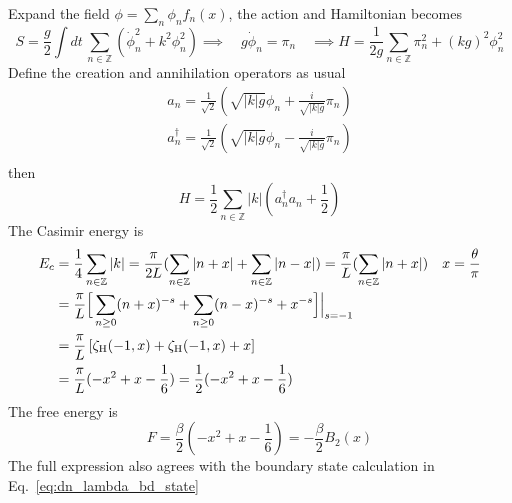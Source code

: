 \documentclass{article}
\begin{document}
Expand the field $\phi = \sum_n \phi_n f_n(x) $, the action and Hamiltonian becomes
\begin{equation}
  S = \frac{g}{2} \int dt \, \sum_{n \in \mathbb{Z} }\left(  \dot{\phi}^2_n + k^2 \phi_n^2 \right) \implies\quad   g \dot{\phi}_n  = \pi_n \quad \implies H =  
\frac{1}{2g}\sum_{n \in \mathbb{Z} } \pi_n^2 + ( kg )^2  \phi_n^2 
\end{equation}
Define the creation and annihilation operators as usual
\begin{equation}
\begin{aligned}
a_n = \frac{1}{\sqrt{2}} ( \sqrt{ |k|g} \phi_n + \frac{i }{\sqrt{|k|g} }\pi_n  ) \\
a^{\dagger}_n = \frac{1}{\sqrt{2}} ( \sqrt{ |k|g} \phi_n - \frac{i }{\sqrt{|k|g} }\pi_n  ) \\
\end{aligned}
\end{equation}
then
\begin{equation}
H = \frac{1}{2} \sum_{n \in \mathbb{Z} } |k|  (a^{\dagger}_n a_n + \frac{1}{2} )
\end{equation}
The Casimir energy is 
\begin{equation}
\begin{aligned}
E_c &= \frac{1}{4} \sum_{n \in \mathbb{Z}} | k| = \frac{\pi}{2L} ( \sum_{n \in \mathbb{Z}}  | n + x | + \sum_{n \in \mathbb{Z}}  | n - x |  )  = \frac{\pi}{L} ( \sum_{n \in \mathbb{Z}}  | n + x |  )\quad x = \frac{\theta}{\pi}\\  
&= \frac{\pi}{L} \Big[\sum_{n \ge 0 } ( n + x )^{-s} + \sum_{n \ge 0 }  ( n - x)^{-s}  +   x^{-s} \Big]\Big|_{s = -1} \\
&= \frac{\pi}{L} \left[ \zeta_{\rm H}( -1, x ) + \zeta_{\rm H}( -1, x ) +  x \right] \\
&= \frac{\pi}{L} ( - x^2 + x - \frac{1}{6})  = \frac{1}{2} ( - x^2 + x - \frac{1}{6})
\end{aligned}
\end{equation}
The free energy is
\begin{equation}
F = \frac{\beta}{2} ( - x^2 + x - \frac{1}{6}) = - \frac{\beta}{2} B_2( x) 
\end{equation}
The full expression also agrees with the boundary state calculation in Eq.~\ref{eq:dn_lambda_bd_state}



\end{document}
